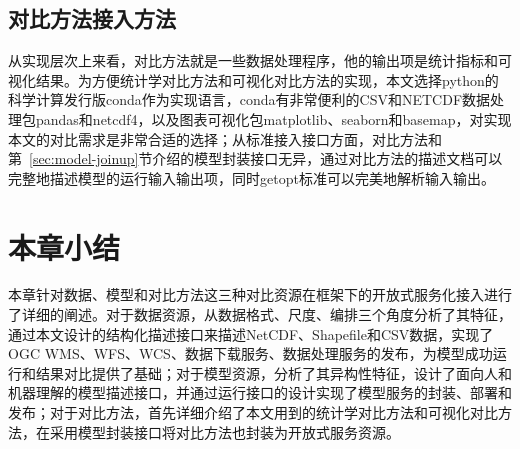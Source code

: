 \subsection{对比方法接入方法}

从实现层次上来看，对比方法就是一些数据处理程序，他的输出项是统计指标和可视化结果。为方便统计学对比方法和可视化对比方法的实现，本文选择python的科学计算发行版conda作为实现语言，conda有非常便利的CSV和NETCDF数据处理包pandas和netcdf4，以及图表可视化包matplotlib、seaborn和basemap，对实现本文的对比需求是非常合适的选择；从标准接入接口方面，对比方法和第~\ref{sec:model-joinup}节介绍的模型封装接口无异，通过对比方法的描述文档可以完整地描述模型的运行输入输出项，同时getopt标准可以完美地解析输入输出。


\section{本章小结}
本章针对数据、模型和对比方法这三种对比资源在框架下的开放式服务化接入进行了详细的阐述。对于数据资源，从数据格式、尺度、编排三个角度分析了其特征，通过本文设计的结构化描述接口来描述NetCDF、Shapefile和CSV数据，实现了OGC WMS、WFS、WCS、数据下载服务、数据处理服务的发布，为模型成功运行和结果对比提供了基础；对于模型资源，分析了其异构性特征，设计了面向人和机器理解的模型描述接口，并通过运行接口的设计实现了模型服务的封装、部署和发布；对于对比方法，首先详细介绍了本文用到的统计学对比方法和可视化对比方法，在采用模型封装接口将对比方法也封装为开放式服务资源。